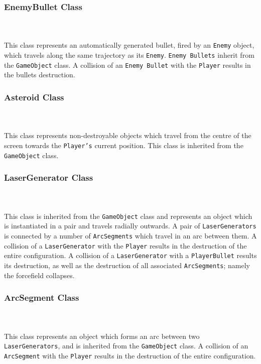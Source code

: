 \documentclass[10pt,twocolumn]{witseiepaper}
\begin{document}
\subsubsection{EnemyBullet Class}
~\\
~\\
This class represents an automatically generated bullet, fired by an \texttt{Enemy} object, which travels along the same trajectory as its \texttt{Enemy}. \texttt{Enemy Bullets} inherit from the \texttt{GameObject} class. A collision of an \texttt{Enemy Bullet} with the \texttt{Player} results in the bullets destruction.

\subsubsection{Asteroid Class}
~\\
~\\
This class represents non-destroyable objects which travel from the centre of the screen towards the \texttt{Player's} current position. This class is inherited from the \texttt{GameObject} class. 

\subsubsection{LaserGenerator Class}
~\\
~\\
This class is inherited from the \texttt{GameObject} class and represents an object which is instantiated in a pair and travels radially outwards. A pair of \texttt{LaserGenerators} is connected by a number of \texttt{ArcSegments} which travel in an arc between them. A collision of a \texttt{LaserGenerator} with the \texttt{Player} results in the destruction of the entire configuration. A collision of a \texttt{LaserGenerator} with a \texttt{PlayerBullet} results its destruction, as well as the destruction of all associated \texttt{ArcSegments}; namely the forcefield collapses.

\subsubsection{ArcSegment Class}
~\\
~\\
This class represents an object which forms an arc between two \texttt{LaserGenerators}, and is inherited from the \texttt{GameObject} class. A collision of an \texttt{ArcSegment} with the \texttt{Player} results in the destruction of the entire configuration.
\end{document}
